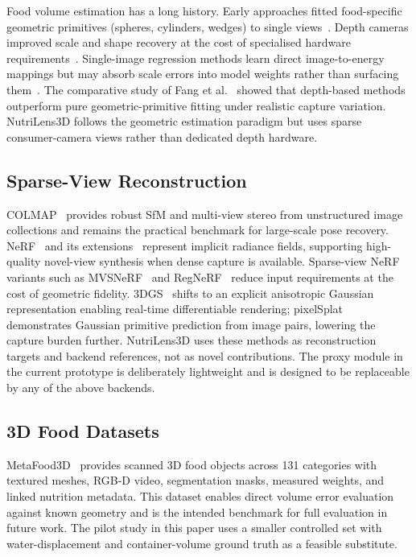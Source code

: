 \documentclass[conference]{IEEEtran}
\begin{document}
Food volume estimation has a long history. Early approaches fitted
food-specific geometric primitives (spheres, cylinders, wedges) to
single views~\cite{puri2009recognition, fang2015single}. Depth cameras
improved scale and shape recovery at the cost of specialised hardware
requirements~\cite{ando2019depthcaloriecam, gao2019musefood}. Single-image
regression methods learn direct image-to-energy mappings but may absorb
scale errors into model weights rather than surfacing
them~\cite{zhu2018single}. The comparative study of Fang
et al.~\cite{fang2016comparison} showed that depth-based methods outperform
pure geometric-primitive fitting under realistic capture variation.
NutriLens3D follows the geometric estimation paradigm but uses sparse
consumer-camera views rather than dedicated depth hardware.

\subsection{Sparse-View Reconstruction}

COLMAP~\cite{schonberger2016sfm, schonberger2016mvs} provides robust SfM and
multi-view stereo from unstructured image collections and remains the practical
benchmark for large-scale pose recovery. NeRF~\cite{mildenhall2020nerf} and its
extensions~\cite{barron2022mipnerf360, muller2022instant} represent implicit
radiance fields, supporting high-quality novel-view synthesis when dense
capture is available. Sparse-view NeRF variants such as MVSNeRF~\cite{chen2021mvsnerf}
and RegNeRF~\cite{niemeyer2022regnerf} reduce input requirements at the
cost of geometric fidelity. 3DGS~\cite{kerbl2023gaussian} shifts to an explicit
anisotropic Gaussian representation enabling real-time differentiable rendering;
pixelSplat~\cite{charatan2024pixelsplat} demonstrates Gaussian primitive
prediction from image pairs, lowering the capture burden further. NutriLens3D
uses these methods as reconstruction targets and backend references, not as
novel contributions. The proxy module in the current prototype is deliberately
lightweight and is designed to be replaceable by any of the above backends.

\subsection{3D Food Datasets}

MetaFood3D~\cite{chen2024metafood3d} provides scanned 3D food objects across
131 categories with textured meshes, RGB-D video, segmentation masks, measured
weights, and linked nutrition metadata. This dataset enables direct volume
error evaluation against known geometry and is the intended benchmark for full
evaluation in future work. The pilot study in this paper uses a smaller
controlled set with water-displacement and container-volume ground truth as
a feasible substitute.
\end{document}
